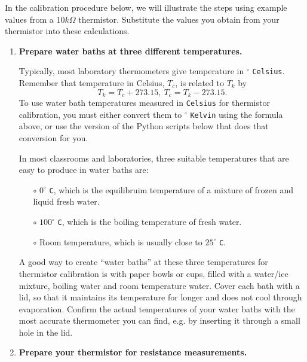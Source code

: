 In the calibration procedure below, we will illustrate the steps using example values from a $10k\Omega$ thermistor.
Substitute the values you obtain from your thermistor into these calculations.
\begin{enumerate}
	\item \textbf{Prepare water baths at three different temperatures.}

	Typically, most laboratory thermometers give temperature in $^\circ$ \texttt{Celsius}.
	Remember that temperature in Celsius, $T_c$, is related to $T_k$ by
	\begin{equation*}
		T_k = T_c + 273.15, ~T_c = T_k - 273.15.
	\end{equation*}
	To use water bath temperatures measured in \texttt{Celsius} for thermistor calibration, you must either convert them to $^\circ$ \texttt{Kelvin} using the formula above, or use the version of the Python scripts below that does that conversion for you.

	\smallskip
	In most classrooms and laboratories, three suitable temperatures that are easy to produce in water baths are:
	\begin{itemize}
		\item[$\circ$] $0^\circ$ \texttt{C}, which is the equilibruim temperature of a mixture of frozen and liquid fresh water.
		\item[$\circ$] $100^\circ$ \texttt{C}, which is the boiling temperature of fresh water.
		\item[$\circ$] Room temperature, which is usually close to $25^\circ$ \texttt{C}.
	\end{itemize}

	A good way to create ``water baths'' at these three temperatures for thermistor calibration is with paper bowls or cups, filled with a water/ice mixture, boiling water and room temperature water.
	Cover each bath with a lid, so that it maintains its temperature for longer and does not cool through evaporation.
	Confirm the actual temperatures of your water baths with the most accurate thermometer you can find, e.g. by inserting it through a small hole in the lid.

	\item \textbf{Prepare your thermistor for resistance measurements.}


\end{enumerate}
